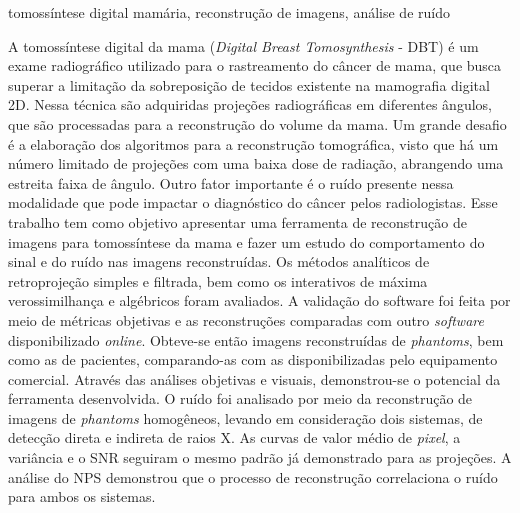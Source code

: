 \documentclass[dissertmst]{eesc}
\begin{document}
\begin{resumo}{tomossíntese digital mamária, reconstrução de imagens, análise de ruído}

A tomossíntese digital da mama (\textit{Digital Breast Tomosynthesis} - \acs{DBT}) é um exame radiográfico utilizado para o rastreamento do câncer de mama, que busca superar a limitação da sobreposição de tecidos existente na mamografia digital \acs{2D}. Nessa técnica são adquiridas projeções radiográficas em diferentes ângulos, que são processadas para a reconstrução do volume da mama. Um grande desafio é a elaboração dos algoritmos para a reconstrução tomográfica, visto que há um número limitado de projeções com uma baixa dose de radiação, abrangendo uma estreita faixa de ângulo. Outro fator importante é o ruído presente nessa modalidade que pode impactar o diagnóstico do câncer pelos radiologistas. Esse trabalho tem como objetivo apresentar uma ferramenta de reconstrução de imagens para tomossíntese da mama e fazer um estudo do comportamento do sinal e do ruído nas imagens reconstruídas. Os métodos analíticos de retroprojeção simples e  filtrada, bem como os interativos de máxima verossimilhança e algébricos foram avaliados. A validação do software foi feita por meio de métricas objetivas e as reconstruções comparadas com outro \textit{software} disponibilizado \textit{online}. Obteve-se então imagens reconstruídas de \textit{phantoms}, bem como as de pacientes, comparando-as com as disponibilizadas pelo equipamento comercial. Através das análises objetivas e visuais, demonstrou-se o potencial da ferramenta desenvolvida. O ruído foi analisado por meio da reconstrução de imagens de \textit{phantoms} homogêneos, levando em consideração dois sistemas, de detecção direta e indireta de raios X. As curvas de valor médio de \textit{pixel}, a variância e o \acs{SNR} seguiram o mesmo padrão já demonstrado para as projeções. A análise do \acs{NPS} demonstrou que o processo de reconstrução correlaciona o ruído para ambos os sistemas.

\end{resumo}
\end{document}
